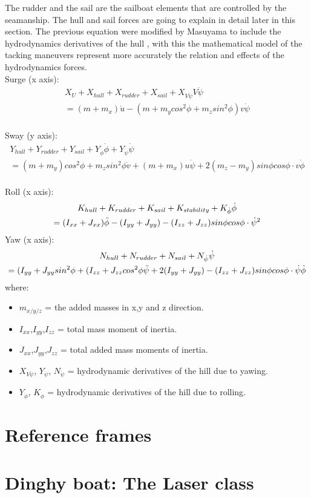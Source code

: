The rudder and the sail are the sailboat elements that are controlled by the seamanship. The hull and sail forces are going to explain in detail later in this section. The previous equation were modified by Masuyama to include the hydrodynamics derivatives of the hull \cite{masuyama2011tacking}, with this \cite{de2004mathematical} the mathematical model of the tacking maneuvers represent more accurately the relation and effects of the hydrodynamics forces.\newline
\\
Surge  (x axis):
\begin{multline}\label{eq:force_xMasuyama}
    X_{U}+X_{hull}+X_{rudder}+X_{sail}+X_{V\Dot{\psi}}V\Dot{\psi}\\ =(m+m_{x})\Dot{u}-(m+m_{y}cos^2\phi+m_{z}sin^2\phi)v\Dot{\psi}
\end{multline}
\\
Sway  (y axis):
\begin{multline}
\label{eq:force_yMasuyama}
Y_{hull} + Y_{rudder} + Y_{sail} + Y_{\Dot{\phi}} \Dot{\phi} + Y_{\Dot{\psi}} \Dot{\psi} \\ 
=(m + m_{y})cos^2 \phi + m_{z} sin^2 \phi \Dot{v} + (m + m_{x})u \Dot{\psi} + 2(m_{z} - m_{y}) sin\phi cos\phi \cdot v \Dot{\phi}
\end{multline}
\\
Roll (x axis):
\begin{multline}
     K_{hull} + K_{rudder} + K_{sail} + K_{stability} +K_{\Dot{\phi}} \Dot{\phi} \\
 =(I_{xx} + J_{xx}) \Ddot{\phi} - {(I_{yy} + J_{yy})-(I_{zz} + J_{zz})} sin\phi cos\phi \cdot \Dot{\psi}^2
\end{multline}  \label{eq:m_xMasuyama}
\newline
Yaw (x axis):
\begin{multline}
   N_{hull}+N_{rudder}+N_{sail}+N_{\Dot{\psi}}\Dot{\psi}\\
 ={(I_{yy} + J_{yy}sin^2 \phi +(I_{zz} + J_{zz}cos^2 \phi}\Ddot{\psi} +2{(I_{yy} + J_{yy})-(I_{zz} + J_{zz})}sin\phi cos\phi \cdot \Dot{\psi} \Dot{\phi}  
\end{multline}\label{eq:m_yMasuyama}
\newline
where: 
\begin{itemize}  \label{symbols_motions2}
 \setlength \itemsep{0em}
\item $m_{x/y/z}$ = the added masses in x,y and z direction.
\item $I_{xx}$,$I_{yy}$,$I_{zz}$ = total mass moment of inertia.
\item $J_{xx}$,$J_{yy}$,$J_{zz}$ = total added mass moments of inertia.
\item $X_{V\Dot{\psi}}$, $Y_{\Dot{\psi}}$, $N_{\Dot{\psi}}$  = hydrodynamic derivatives of the hill due to yawing.
\item $Y_{\Dot{\phi}}$, $K_{\Dot{\phi}}$  = hydrodynamic derivatives of the hill due to rolling.
\end{itemize}




\section{Reference frames}
\section{Dinghy boat: The Laser class}